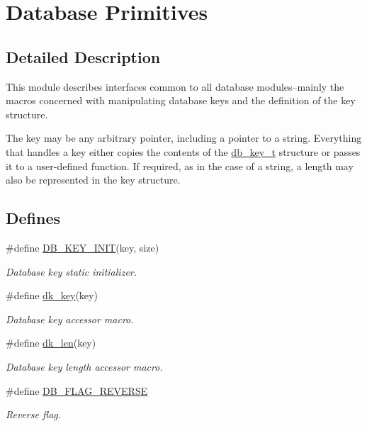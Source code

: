 \hypertarget{group__dbprim}{
\section{Database Primitives}
\label{group__dbprim}
}


\subsection{Detailed Description}
This module describes interfaces common to all database modules--mainly the macros concerned with manipulating database keys and the definition of the key structure.

The key may be any arbitrary pointer, including a pointer to a string. Everything that handles a key either copies the contents of the \hyperlink{group__dbprim_a0}{db\_\-key\_\-t} structure or passes it to a user-defined function. If required, as in the case of a string, a length may also be represented in the key structure. 

\subsection*{Defines}
\begin{CompactItemize}
\item 
\#define \hyperlink{group__dbprim_a1}{DB\_\-KEY\_\-INIT}(key, size)
\begin{CompactList}\small\item\em Database key static initializer. \item\end{CompactList}\item 
\#define \hyperlink{group__dbprim_a2}{dk\_\-key}(key)
\begin{CompactList}\small\item\em Database key accessor macro. \item\end{CompactList}\item 
\#define \hyperlink{group__dbprim_a3}{dk\_\-len}(key)
\begin{CompactList}\small\item\em Database key length accessor macro. \item\end{CompactList}\item 
\#define \hyperlink{group__dbprim_a4}{DB\_\-FLAG\_\-REVERSE}
\begin{CompactList}\small\item\em Reverse flag. \item\end{CompactList}\end{CompactItemize}

